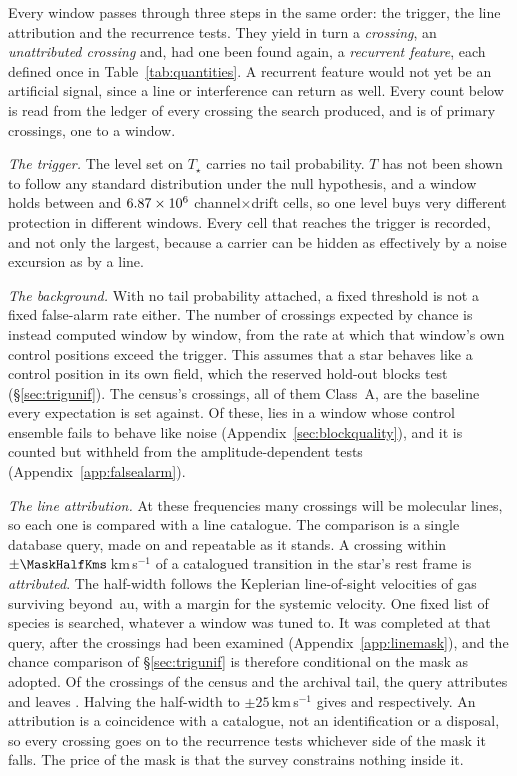 Every window passes through three steps in the same order: the trigger, the
line attribution and the recurrence tests. They yield in turn a
\emph{crossing}, an \emph{unattributed crossing} and, had one been found
again, a \emph{recurrent feature}, each defined once in
Table~\ref{tab:quantities}. A recurrent feature would not yet be an
artificial signal, since a line or interference can return as well.
Every count below is read from the ledger of every crossing the search
produced, and is of primary crossings, one to a window.

\emph{The trigger.} The level set on $T_\star$ carries no tail probability.
$T$ has not been shown to follow any standard distribution under the null
hypothesis, and a window holds between \TuCellsLo{} and $6.87 \times 10^{6}$
channel$\times$drift cells, so one level buys very different protection in
different windows. Every cell that reaches the trigger is recorded, and not
only the largest, because a carrier can be hidden as effectively by a noise
excursion as by a line.

\emph{The background.} With no tail probability attached, a fixed threshold
is not a fixed false-alarm rate either. The number of crossings expected by chance is instead computed window
by window, from the rate at which that window's own control positions exceed
the trigger. This assumes that a star behaves like a control position in its
own field, which the reserved hold-out blocks test (\S\ref{sec:trigunif}).
The census's \CsNCrossQp{} crossings, all of them Class~A, are the baseline
every expectation is set against. Of these, \BkFlagNCrossOtherWord{} lies in a
window whose control ensemble fails to behave like noise
(Appendix~\ref{sec:blockquality}), and it is counted but withheld from the
amplitude-dependent tests (Appendix~\ref{app:falsealarm}).

\emph{The line attribution.} At these frequencies many crossings will be
molecular lines, so each one is compared with a line catalogue. The
comparison is a single database query, made on \MkListDate{} and repeatable
as it stands. A crossing within $\pm\MaskHalfKms$\,km\,s$^{-1}$ of a
catalogued transition in the star's rest frame is \emph{attributed}. The
half-width follows the Keplerian line-of-sight velocities of gas surviving
beyond \EcKepRAu\,au, with a margin for the systemic velocity. One fixed list of
\FrNSpec{} species is searched, whatever a window was tuned to. It was
completed at that query, after the crossings had been examined
(Appendix~\ref{app:linemask}), and the chance comparison of
\S\ref{sec:trigunif} is therefore conditional on the mask as adopted. Of the
\CnCross{} crossings of the census and the archival tail, the query attributes
\FrAttrWFifty{} and leaves \FrUnattrWFifty. Halving the half-width to
$\pm25$\,km\,s$^{-1}$ gives \FrAttrWTwentyFive{} and \FrUnattrWTwentyFive{}
respectively.
An attribution is a coincidence with a catalogue, not an identification or a
disposal, so every crossing goes on to the recurrence tests whichever side of
the mask it falls. The price of the mask is that the survey constrains
nothing inside it.

